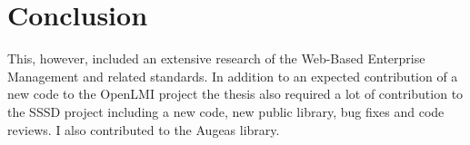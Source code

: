 \chapter{Conclusion}

This, however, included an extensive research of the Web-Based Enterprise
Management and related standards. In addition to an expected contribution of a
new code to the OpenLMI project the thesis also required a lot of contribution
to the SSSD project including a new code, new public library, bug fixes and code
reviews. I also contributed to the Augeas library.